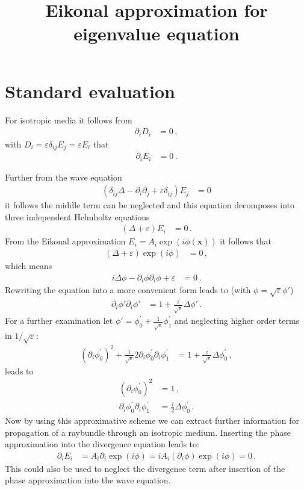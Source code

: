 \documentclass[a4paper,10pt]{revtex4-1}
\title{Eikonal approximation for eigenvalue equation}
\begin{document}
\section{Standard evaluation}

For isotropic media it follows from
\begin{align}
 \partial_i D_i &= 0\,,
\end{align}
with $D_i = \varepsilon \delta_{ij} E_j = \varepsilon E_i$ that
\begin{align}
 \partial_i E_i &= 0\,.
\end{align}

Further from the wave equation
\begin{align}
 (\delta_{ij} \Delta - \partial_i \partial_j + \varepsilon \delta_{ij}) E_j &= 0
\end{align}
it follows the middle term can be neglected and this equation decomposes into three independent Helmholtz equations
\begin{align}
  (\Delta + \varepsilon) E_i &= 0\,. 
\end{align}
From the Eikonal approximation $E_i = A_i \exp(i \phi(\mathbf{x}))$ it follows that
\begin{align}
  (\Delta + \varepsilon) \exp(i \phi) &= 0\,,
\end{align}
which means
\begin{align}
 i \Delta \phi - \partial_i \phi \partial_i \phi + \varepsilon &= 0\,.
\end{align}
Rewriting the equation into a more convenient form leads to (with $\phi = \sqrt{\varepsilon} \phi'$)
\begin{align}
 \partial_i \phi' \partial_i \phi' &= 1 + \frac{i}{\sqrt{\varepsilon}} \Delta \phi'\,.
\end{align}
For a further examination let $\phi' = \phi^\prime_0 + \frac{1}{\sqrt{\varepsilon}} \phi^\prime_1$ and neglecting higher order terms in $1/\sqrt{\varepsilon}$:
\begin{align}
 (\partial_i \phi^\prime_0)^2 + \frac{1}{\sqrt{\varepsilon}} 2 \partial_i \phi^\prime_0 \partial_i \phi^\prime_1 &= 1 + \frac{i}{\sqrt{\varepsilon}} \Delta \phi^\prime_0\,,
\end{align}
leads to
\begin{align}
 (\partial_i \phi^\prime_0)^2 &= 1\,,\\
 \partial_i \phi^\prime_0 \partial_i \phi^\prime_1 &= \frac{i}{2} \Delta \phi^\prime_0\,.
\end{align}
Now by using this approximative scheme we can extract further information for propagation of a raybundle through an isotropic medium.
Inserting the phase approximation into the divergence equation leads to:
\begin{align}
 \partial_i E_i &= A_i \partial_i \exp(i \phi) = i A_i (\partial_i \phi) \exp(i \phi) = 0\,. 
\end{align}
This could also be used to neglect the divergence term after insertion of the phase approximation into the wave equation.
\end{document}
